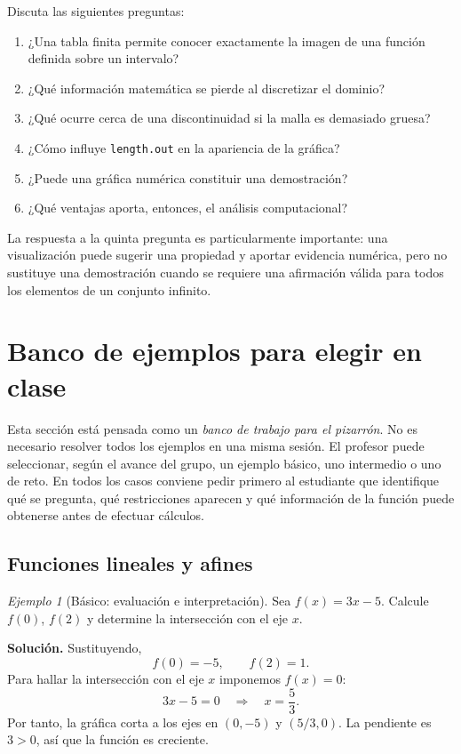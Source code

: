 \documentclass[12pt]{article}
\theoremstyle{remark}
\newtheorem{ejemplo}{Ejemplo}[section]
\begin{document}
Discuta las siguientes preguntas:

\begin{enumerate}
    \item ¿Una tabla finita permite conocer exactamente la imagen de una
    función definida sobre un intervalo?
    \item ¿Qué información matemática se pierde al discretizar el dominio?
    \item ¿Qué ocurre cerca de una discontinuidad si la malla es demasiado
    gruesa?
    \item ¿Cómo influye \texttt{length.out} en la apariencia de la gráfica?
    \item ¿Puede una gráfica numérica constituir una demostración?
    \item ¿Qué ventajas aporta, entonces, el análisis computacional?
\end{enumerate}

La respuesta a la quinta pregunta es particularmente importante: una
visualización puede sugerir una propiedad y aportar evidencia numérica, pero
no sustituye una demostración cuando se requiere una afirmación válida para
todos los elementos de un conjunto infinito.


\section{Banco de ejemplos para elegir en clase}
\label{sec:banco-ejemplos}

Esta sección está pensada como un \emph{banco de trabajo para el pizarrón}. No es necesario resolver todos los ejemplos en una misma sesión. El profesor puede seleccionar, según el avance del grupo, un ejemplo básico, uno intermedio o uno de reto. En todos los casos conviene pedir primero al estudiante que identifique qué se pregunta, qué restricciones aparecen y qué información de la función puede obtenerse antes de efectuar cálculos.

\subsection{Funciones lineales y afines}

\begin{ejemplo}[Básico: evaluación e interpretación]
Sea $f(x)=3x-5$. Calcule $f(0)$, $f(2)$ y determine la intersección con el eje $x$.

\textbf{Solución.} Sustituyendo,
\[
f(0)=-5,\qquad f(2)=1.
\]
Para hallar la intersección con el eje $x$ imponemos $f(x)=0$:
\[
3x-5=0\quad\Longrightarrow\quad x=\frac53.
\]
Por tanto, la gráfica corta a los ejes en $(0,-5)$ y $(5/3,0)$. La pendiente es $3>0$, así que la función es creciente.
\end{ejemplo}
\end{document}
